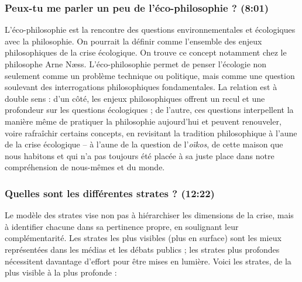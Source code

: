 \subsubsection{Peux-tu me parler un peu de l'éco-philosophie ? \textnormal{\small(8:01)}}

L'éco-philosophie est la rencontre des questions environnementales et écologiques avec la philosophie. On pourrait la définir comme l'ensemble des enjeux philosophiques de la crise écologique. On trouve ce concept notamment chez le philosophe Arne Næss. L'éco-philosophie permet de penser l'écologie non seulement comme un problème technique ou politique, mais comme une question soulevant des interrogations philosophiques fondamentales. La relation est à double sens : d'un côté, les enjeux philosophiques offrent un recul et une profondeur sur les questions écologiques ; de l'autre, ces questions interpellent la manière même de pratiquer la philosophie aujourd'hui et peuvent renouveler, voire rafraîchir certains concepts, en revisitant la tradition philosophique à l'aune de la crise écologique -- à l'aune de la question de l'\textit{oïkos}, de cette maison que nous habitons et qui n'a pas toujours été placée à sa juste place dans notre compréhension de nous-mêmes et du monde.

\subsubsection{Quelles sont les différentes strates ? \textnormal{\small(12:22)}}

Le modèle des strates vise non pas à hiérarchiser les dimensions de la crise, mais à identifier chacune dans sa pertinence propre, en soulignant leur complémentarité. Les strates les plus visibles (plus en surface) sont les mieux représentées dans les médias et les débats publics ; les strates plus profondes nécessitent davantage d'effort pour être mises en lumière. Voici les strates, de la plus visible à la plus profonde :

